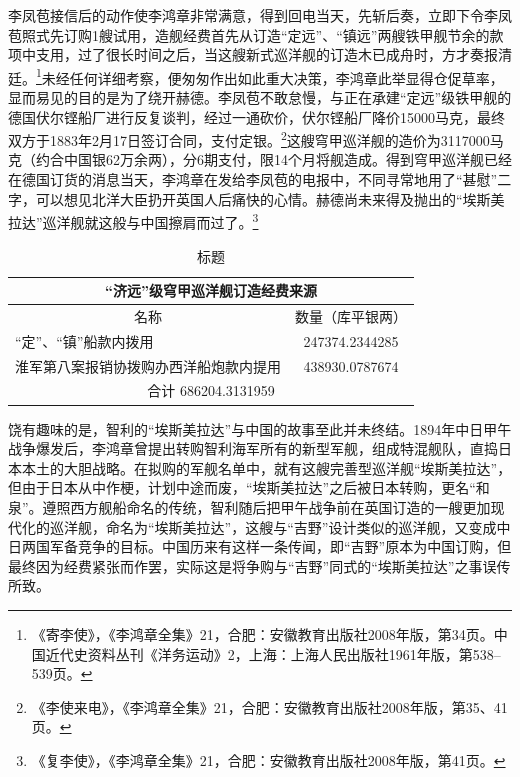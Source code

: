 \documentclass[12pt,UTF8]{ctexbook}
\begin{document}
李凤苞接信后的动作使李鸿章非常满意，得到回电当天，先斩后奏，立即下令李凤苞照式先订购1艘试用，造舰经费首先从订造“定远”、“镇远”两艘铁甲舰节余的款项中支用，过了很长时间之后，当这艘新式巡洋舰的订造木已成舟时，方才奏报清廷。\footnote{《寄李使》，《李鸿章全集》21，合肥：安徽教育出版社2008年版，第34页。中国近代史资料丛刊《洋务运动》2，上海：上海人民出版社1961年版，第538--539页。}未经任何详细考察，便匆匆作出如此重大决策，李鸿章此举显得仓促草率，显而易见的目的是为了绕开赫德。李凤苞不敢怠慢，与正在承建“定远”级铁甲舰的德国伏尔铿船厂进行反复谈判，经过一通砍价，伏尔铿船厂降价15000马克，最终双方于1883年2月17日签订合同，支付定银。\footnote{《李使来电》，《李鸿章全集》21，合肥：安徽教育出版社2008年版，第35、41页。}这艘穹甲巡洋舰的造价为3117000马克（约合中国银62万余两），分6期支付，限14个月将舰造成。得到穹甲巡洋舰已经在德国订货的消息当天，李鸿章在发给李凤苞的电报中，不同寻常地用了“甚慰”二字，可以想见北洋大臣扔开英国人后痛快的心情。赫德尚未来得及抛出的“埃斯美拉达”巡洋舰就这般与中国擦肩而过了。\footnote{《复李使》，《李鸿章全集》21，合肥：安徽教育出版社2008年版，第41页。}

\begin{table}[]
\centering
\label{tab:标签}
\caption{标题}
\begin{tabular}{|cc|}
\hline
\multicolumn{2}{|c|}{“济远”级穹甲巡洋舰订造经费来源}        \\ \hline
\multicolumn{1}{|c|}{名称} & 数量（库平银两）               \\ \hline
\multicolumn{1}{|l|}{“定”、“镇”船款内拨用} & 247374.2344285 \\ \hline
\multicolumn{1}{|l|}{淮军第八案报销协拨购办西洋船炮款内提用} & 438930.0787674 \\ \hline
\multicolumn{2}{|c|}{合计 686204.3131959}                   \\ \hline
\end{tabular}
\end{table}

饶有趣味的是，智利的“埃斯美拉达”与中国的故事至此并未终结。1894年中日甲午战争爆发后，李鸿章曾提出转购智利海军所有的新型军舰，组成特混舰队，直捣日本本土的大胆战略。在拟购的军舰名单中，就有这艘完善型巡洋舰“埃斯美拉达”，但由于日本从中作梗，计划中途而废，“埃斯美拉达”之后被日本转购，更名“和泉”。遵照西方舰船命名的传统，智利随后把甲午战争前在英国订造的一艘更加现代化的巡洋舰，命名为“埃斯美拉达”，这艘与“吉野”设计类似的巡洋舰，又变成中日两国军备竞争的目标。中国历来有这样一条传闻，即“吉野”原本为中国订购，但最终因为经费紧张而作罢，实际这是将争购与“吉野”同式的“埃斯美拉达”之事误传所致。
\end{document}
